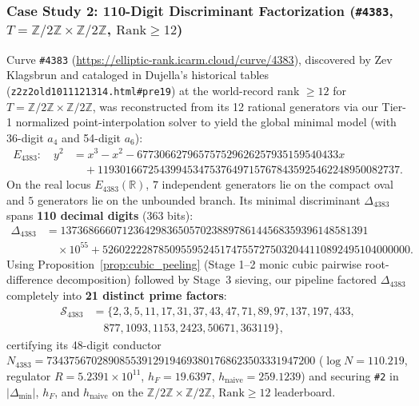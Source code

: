 \documentclass[10pt,a4paper]{article}
\theoremstyle{plain}
\theoremstyle{definition}
\theoremstyle{remark}
\begin{document}
\subsubsection{\texorpdfstring{Case Study 2: 110-Digit Discriminant Factorization (\texttt{\#4383}, $T = \mathbb{Z}/2\mathbb{Z} \times \mathbb{Z}/2\mathbb{Z}$, $\mathrm{Rank} \ge 12$)}{Case Study 2: 110-Digit Discriminant Factorization (\#4383, T = Z/2Z x Z/2Z, Rank >= 12)}}

Curve \texttt{\#4383} (\url{https://elliptic-rank.icarm.cloud/curve/4383}), discovered by Zev Klagsbrun and cataloged in Dujella's historical tables (\texttt{z2z2old1011121314.html\#pre19}) at the world-record rank $\ge 12$ for $T = \mathbb{Z}/2\mathbb{Z} \times \mathbb{Z}/2\mathbb{Z}$, was reconstructed from its 12 rational generators via our Tier-1 normalized point-interpolation solver to yield the global minimal model (with 36-digit $a_4$ and 54-digit $a_6$):
\begin{align}
E_{4383}: \quad y^2 &= x^3 - x^2 - 677306627965757529626257935159540433 x \nonumber \\
&\quad + 119301667254399453475376497157678435925462248950082737.
\end{align}
On the real locus $E_{4383}(\mathbb{R})$, $7$ independent generators lie on the compact oval and $5$ generators lie on the unbounded branch. Its minimal discriminant $\Delta_{4383}$ spans \textbf{110 decimal digits} ($363$ bits):
\begin{align*}
\Delta_{4383} &= 1373686660712364298365057023889786144568359396148581391 \\
&\quad \times 10^{55} + 5260222287850955952451747557275032044110892495104000000.
\end{align*}
Using Proposition~\ref{prop:cubic_peeling} (Stage 1--2 monic cubic pairwise root-difference decomposition) followed by Stage~3 sieving, our pipeline factored $\Delta_{4383}$ completely into \textbf{21 distinct prime factors}:
\begin{align}
\mathcal{S}_{4383} &= \{2, 3, 5, 11, 17, 31, 37, 43, 47, 71, 89, 97, 137, 197, 433, \nonumber \\
&\quad 877, 1093, 1153, 2423, 50671, 363119\},
\end{align}
certifying its 48-digit conductor $N_{4383} = 734375670289085539129194693801768623503331947200$ ($\log N = 110.219$, regulator $R = 5.2391 \times 10^{11}$, $h_F = 19.6397$, $h_{\text{naive}} = 259.1239$) and securing \texttt{\#2} in $|\Delta_{\min}|$, $h_F$, and $h_{\text{naive}}$ on the $\mathbb{Z}/2\mathbb{Z} \times \mathbb{Z}/2\mathbb{Z}$, $\mathrm{Rank} \ge 12$ leaderboard.
\end{document}
